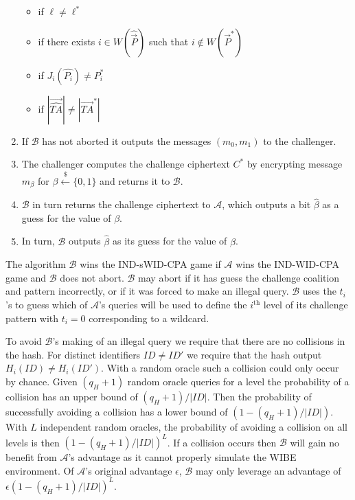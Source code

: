\documentclass[10pt]{llncs}
\newcommand{\A}{\mathcal{A}}
\newcommand{\B}{\mathcal{B}}
\newcommand{\ID}{\mathit{ID}}
\newcommand{\TA}{\mathit{TA}}
\newcommand{\getsr}{\stackrel{{\scriptscriptstyle\$}}{\gets}}
\begin{document}
\begin{enumerate}
\begin{itemize}
			\item if $\ell \neq \ell^{*}$
			\item if there exists $i \in W(\widehat{\vec{P}})$ such that $i \notin W(\vec{P}^{*})$
			\item if $J_i(\widehat{P_i}) \neq P^{*}_i$
			\comment{\item if $J_1(\widehat{\TA_i}) \notin \vec{\TA}^{*}$}
			\item if $|\vec{\widehat{\TA}}| \neq |\vec{\TA}^{*}|$
		\end{itemize}
	\item If $\B$ has not aborted it outputs the messages $(m_0, m_1)$ to the challenger.
	\item The challenger computes the challenge ciphertext $C^{*}$ by encrypting message $m_\beta$ for $\beta \getsr \{0, 1\}$ and returns it to $\B$.
	\item $\B$ in turn returns the challenge ciphertext to $\A$, which outputs a bit $\widehat{\beta}$ as a guess for the value of $\beta$.
	\item In turn, $\B$ outputs $\widehat{\beta}$ as its guess for the value of $\beta$.
\end{enumerate}

The algorithm $\B$ wins the IND-sWID-CPA game if $\A$ wins the IND-WID-CPA game and $\B$ does not abort. $\B$ may abort if it has guess the challenge coalition and pattern incorrectly, or if it was forced to make an illegal query. $\B$ uses the $t_i$'s to guess which of $\A$'s queries will be used to define the $i^{\textrm{th}}$ level of its challenge pattern with $t_i =0$ corresponding to a wildcard.

To avoid $\B$'s making of an illegal query we require that there are no collisions in the hash. For distinct identifiers $\ID \ne \ID'$ we require that the hash output $H_i(\ID) \ne H_i(\ID')$. With a random oracle such a collision could only occur by chance. Given $(q_H + 1)$ random oracle queries for a level the probability of a collision has an upper bound of $(q_H + 1)/|\mathcal{\ID}|$. Then the probability of successfully avoiding a collision has a lower bound of $(1 - (q_H + 1)/|\mathcal{\ID}|)$. With $L$ independent random oracles, the probability of avoiding a collision on all levels is then $(1 - (q_H + 1)/|\mathcal{\ID}|)^L$. If a collision occurs then $\B$ will gain no benefit from $\A$'s advantage as it cannot properly simulate the WIBE environment. Of $\A$'s original advantage $\epsilon$, $\B$ may only leverage an advantage of $\epsilon(1 - (q_H + 1)/|\mathcal{\ID}|)^L$.
\end{document}
